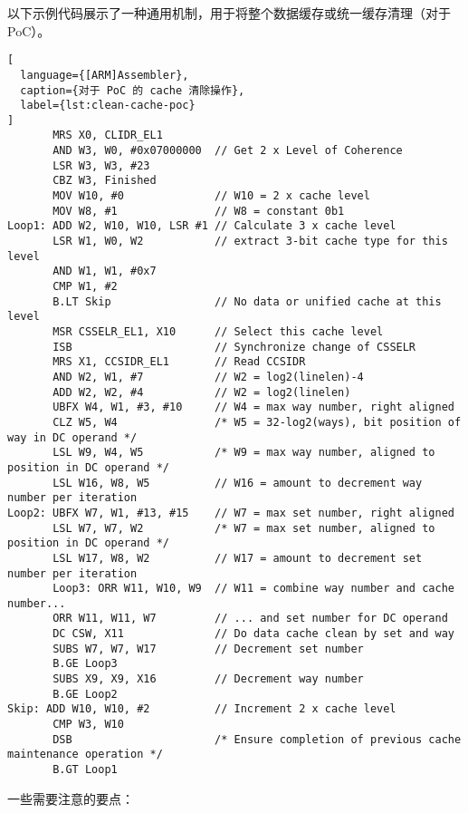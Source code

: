 以下示例代码展示了一种通用机制，用于将整个数据缓存或统一缓存清理（对于 PoC）。

\begin{lstlisting}[
  language={[ARM]Assembler},
  caption={对于 PoC 的 cache 清除操作},
  label={lst:clean-cache-poc}
]
       MRS X0, CLIDR_EL1
       AND W3, W0, #0x07000000  // Get 2 x Level of Coherence
       LSR W3, W3, #23
       CBZ W3, Finished
       MOV W10, #0              // W10 = 2 x cache level
       MOV W8, #1               // W8 = constant 0b1
Loop1: ADD W2, W10, W10, LSR #1 // Calculate 3 x cache level
       LSR W1, W0, W2           // extract 3-bit cache type for this level
       AND W1, W1, #0x7
       CMP W1, #2
       B.LT Skip                // No data or unified cache at this level
       MSR CSSELR_EL1, X10      // Select this cache level
       ISB                      // Synchronize change of CSSELR
       MRS X1, CCSIDR_EL1       // Read CCSIDR
       AND W2, W1, #7           // W2 = log2(linelen)-4
       ADD W2, W2, #4           // W2 = log2(linelen)
       UBFX W4, W1, #3, #10     // W4 = max way number, right aligned
       CLZ W5, W4               /* W5 = 32-log2(ways), bit position of way in DC operand */
       LSL W9, W4, W5           /* W9 = max way number, aligned to position in DC operand */
       LSL W16, W8, W5          // W16 = amount to decrement way number per iteration
Loop2: UBFX W7, W1, #13, #15    // W7 = max set number, right aligned
       LSL W7, W7, W2           /* W7 = max set number, aligned to position in DC operand */
       LSL W17, W8, W2          // W17 = amount to decrement set number per iteration
       Loop3: ORR W11, W10, W9  // W11 = combine way number and cache number...
       ORR W11, W11, W7         // ... and set number for DC operand
       DC CSW, X11              // Do data cache clean by set and way
       SUBS W7, W7, W17         // Decrement set number
       B.GE Loop3
       SUBS X9, X9, X16         // Decrement way number
       B.GE Loop2
Skip: ADD W10, W10, #2          // Increment 2 x cache level
       CMP W3, W10
       DSB                      /* Ensure completion of previous cache maintenance operation */
       B.GT Loop1
\end{lstlisting}

一些需要注意的要点：

